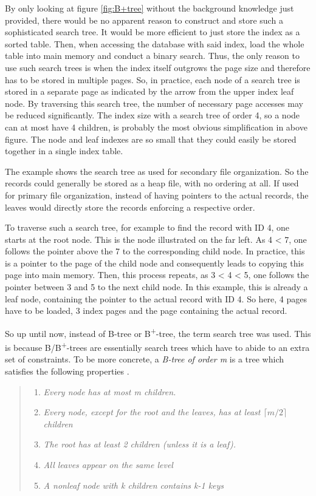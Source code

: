 By only looking at figure \ref{fig:B+tree} without the background knowledge just provided, there would be no apparent reason to construct and store such a sophisticated search tree. It would be more efficient to just store the index as a sorted table. Then, when accessing the database with said index, load the whole table into main memory and conduct a binary search. Thus, the only reason to use such search trees is when the index itself outgrows the page size and therefore has to be stored in multiple pages. So, in practice, each node of a search tree is stored in a separate page as indicated by the arrow from the upper index leaf node. By traversing this search tree, the number of necessary page accesses may be reduced significantly. The index size with a search tree of order 4, so a node can at most have 4 children, is probably the most obvious simplification in above figure. The node and leaf indexes are so small that they could easily be stored together in a single index table.\par 
The example shows the search tree as used for secondary file organization. So the records could generally be stored as a heap file, with no ordering at all. If used for primary file organization, instead of having pointers to the actual records, the leaves would directly store the records enforcing a respective order.\par
To traverse such a search tree, for example to find the record with ID 4, one starts at the root node. This is the node illustrated on the far left. As 4 < 7, one follows the pointer above the 7 to the corresponding child node. In practice, this is a pointer to the page of the child node and consequently leads to copying this page into main memory. Then, this process repeats, as 3 < 4 < 5, one follows the pointer between 3 and 5 to the next child node. In this example, this is already a leaf node, containing the pointer to the actual record with ID 4. So here, 4 pages have to be loaded, 3 index pages and the page containing the actual record.\par
So up until now, instead of B-tree or B\textsuperscript{+}-tree, the term search tree was used. This is because B/B\textsuperscript{+}-trees are essentially search trees which have to abide to an extra set of constraints. To be more concrete, a \emph{B-tree of order m} is a tree which satisfies the following properties \cite{SortingSearchingBible}.

\begin{quote}
	\begin{enumerate}
		\item\textit{Every node has at most m children. }
		\item\textit{Every node, except for the root and the leaves, has at least $\lceil m/2 \rceil$ children}
		\item\textit{The root has at least 2 children (unless it is a leaf).}
		\item\textit{All leaves appear on the same level}
		\item\textit{A nonleaf node with k children contains k-1 keys}
	\end{enumerate}
\end{quote}

